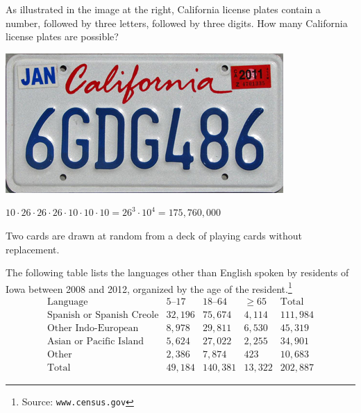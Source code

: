 \documentclass[answers,addpoints,12pt]{exam}
\begin{document}
\begin{questions}

\begin{multicols}{2}
\question[10]
As illustrated in the image at the right,
California license plates contain a number,
followed by three letters, followed by three digits.
How many California license plates are possible?\\
\columnbreak
\begin{center}\includegraphics[scale=.4]{California}
\end{center}
\end{multicols}
\begin{solution}{\vfill}
$10\cdot 26\cdot 26\cdot 26\cdot 10\cdot 10\cdot 10=26^3\cdot 10^4
=175,760,000$
\end{solution}
\newpage

\question[16] Two cards are drawn at random from a deck of playing cards
without replacement.

\question[18] The following table lists
the languages other than English spoken by residents
of Iowa between 2008 and 2012, organized by the age
of the resident.\footnote{Source: {\tt www.census.gov}}
\[\begin{array}{r|rrr|r}
\text{Language}&\text{$5$--$17$}
&\text{$18$--$64$}&\ge 65&\text{Total}\\\hline
\text{Spanish or Spanish Creole}&32,196&75,674&4,114&111,984\\
\text{Other Indo-European}&8,978&29,811&6,530&45,319\\
\text{Asian or Pacific Island}&5,624&27,022&2,255&34,901\\
\text{Other}&2,386&7,874&423&10,683\\\hline
\text{Total}&49,184&140,381&13,322&202,887
\end{array}\]
\begin{parts}

\end{parts}
\end{questions}
\end{document}

